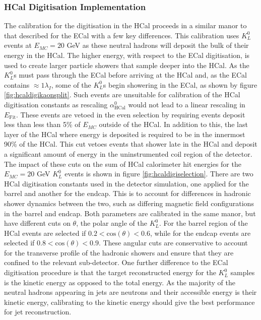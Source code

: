\subsubsection{HCal Digitisation Implementation}
\label{sec:hcaldigi}
The calibration for the digitisation in the HCal proceeds in a similar manor to that described for the ECal with a few key differences.  This calibration uses $K^{0}_{L}$ events at $E_{MC} = 20$ GeV as these neutral hadrons will deposit the bulk of their energy in the HCal.  The higher energy, with respect to the ECal digitisation, is used to create larger particle showers that sample deeper into the HCal.  As the $K^{0}_{L}$s must pass through the ECal before arriving at the HCal and, as the ECal contains $\approx 1 \lambda_{I}$, some of the $K^{0}_{L}$s begin showering in the ECal, as shown by figure \ref{fig:hcaldigikaonsplit}.  Such events are unsuitable for calibration of the HCal digitisation constants as rescaling $\alpha^{0}_{\text{HCal}}$ would not lead to a linear rescaling in $E_{\text{Fit}}$.  These events are vetoed in the even selection by requiring events deposit less than less than 5\% of $E_{MC}$ outside of the HCal.  In addition to this, the last layer of the HCal where energy is deposited is required to be in the innermost 90\% of the HCal.  This cut vetoes events that shower late in the HCal and deposit a significant amount of energy in the uninstrumented coil region of the detector.  The impact of these cuts on the sum of HCal calorimeter hit energies for the $E_{MC} = 20$ GeV $K^{0}_{L}$ events is shown in figure \ref{fig:hcaldigiselection}.  There are two HCal digitisation constants used in the detector simulation, one applied for the barrel and another for the endcap.  This is to account for differences in hadronic shower dynamics between the two, such as differing magnetic field configurations in the barrel and endcap.  Both parameters are calibrated in the same manor, but have different cuts on $\theta$, the polar angle of the $K^{0}_{L}$.  For the barrel region of the HCal events are selected if $0.2 < \text{cos}(\theta) < 0.6$, while for the endcap events are selected if $0.8 < \text{cos}(\theta) < 0.9$.  These angular cuts are conservative to account for the transverse profile of the hadronic showers and ensure that they are confined to the relevant sub-detector.  One further difference to the ECal digitisation procedure is that the target reconstructed energy for the $K^{0}_{L}$ samples is the kinetic energy as opposed to the total energy.  As the majority of the neutral hadrons appearing in jets are neutrons and their accessible energy is their kinetic energy, calibrating to the kinetic energy should give the best performance for jet reconstruction.  

